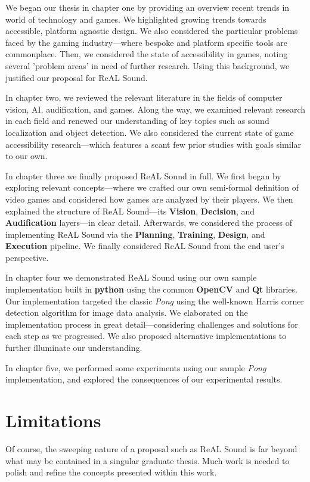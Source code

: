 \documentclass{report}
\newcommand{\rs}{ReAL Sound\xspace}
\newcommand{\plan}{\textbf{Planning}\xspace}
\newcommand{\train}{\textbf{Training}\xspace}
\newcommand{\design}{\textbf{Design}\xspace}
\newcommand{\exec}{\textbf{Execution}\xspace}
\newcommand{\vision}{\textbf{Vision}\xspace}
\newcommand{\decision}{\textbf{Decision}\xspace}
\newcommand{\audio}{\textbf{Audification}\xspace}
\newcommand{\tech}[1]{\textbf{#1}}
\begin{document}
We began our thesis in chapter one by providing an overview recent trends in world of technology and games. We highlighted growing trends towards accessible, platform agnostic design. We also considered the particular problems faced by the gaming industry---where bespoke and platform specific tools are commonplace. Then, we considered the state of accessibility in games, noting several 'problem areas' in need of further research. Using this background, we justified our proposal for \rs. 

In chapter two, we reviewed the relevant literature in the fields of computer vision, AI, audification, and games. Along the way, we examined relevant research in each field and renewed our understanding of key topics such as sound localization and object detection. We also considered the current state of game accessibility research---which features a scant few prior studies with goals similar to our own.

In chapter three we finally proposed \rs in full. We first began by exploring relevant concepts---where we crafted our own semi-formal definition of video games and considered how games are analyzed by their players. We then explained the structure of \rs---its \vision, \decision, and \audio layers---in clear detail. Afterwards, we considered the process of implementing \rs via the \plan, \train, \design, and \exec pipeline. We finally considered \rs from the end user's perspective.

In chapter four we demonstrated \rs using our own sample implementation built in \tech{python} using the common \tech{OpenCV} and \tech{Qt} libraries. Our implementation targeted the classic \emph{Pong} using the well-known Harris corner detection algorithm for image data analysis. We elaborated on the implementation process in great detail---considering challenges and solutions for each step as we progressed. We also proposed alternative implementations to further illuminate our understanding.

In chapter five, we performed some experiments using our sample \emph{Pong} implementation, and explored the consequences of our experimental results.

\section{Limitations}
Of course, the sweeping nature of a proposal such as \rs is far beyond what may be contained in a singular graduate thesis. Much work is needed to polish and refine the concepts presented within this work.
\end{document}
